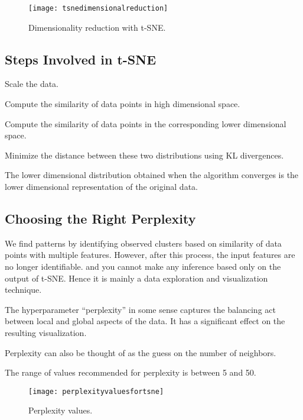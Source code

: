  	\begin{figure}[h]
		\centering
		\texttt{[image: tsnedimensionalreduction]}
		\caption[Dimensionality reduction with t-SNE]{Dimensionality reduction with t-SNE.}
		\label{fig:tsnedimensionalreduction}
	\end{figure}

	\subsection{Steps Involved in t-SNE}
	\begin{bulletedlist}
		\item Scale the data.
		\item Compute the similarity of data points in high dimensional space.
		\item Compute the similarity of data points in the corresponding lower dimensional space.
		\item Minimize the distance between these two distributions using KL divergences.
		\item The lower dimensional distribution obtained when the algorithm converges is the lower dimensional representation of the original data.
	\end{bulletedlist}

	\subsection{Choosing the Right Perplexity}
	\begin{bulletedlist}
		\item We find patterns by identifying observed clusters based on similarity of data points with multiple features.  However, after this process, the input features are no longer identifiable. and you cannot make any inference based only on the output of t-SNE.  Hence it is mainly a data exploration and visualization technique.
		\item The hyperparameter ``perplexity'' in some sense captures the balancing act between local and global aspects of the data.  It has a significant effect on the resulting visualization.
		\item Perplexity can also be thought of as the guess on the number of neighbors.
		\item The range of values recommended for perplexity is between 5 and 50.
	\end{bulletedlist}

 	\begin{figure}[h]
		\centering
		\texttt{[image: perplexityvaluesfortsne]}
		\caption[Perplexity values]{Perplexity values.}
		\label{fig:perplexityvaluesfortsne}
	\end{figure}

